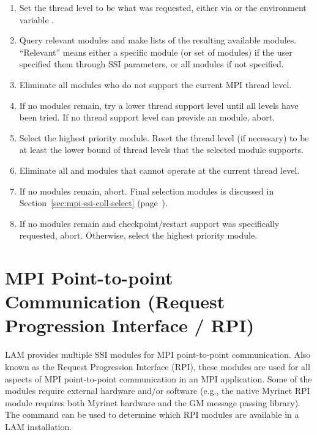 \begin{enumerate}
\item Set the thread level to be what was requested, either via
   or the environment variable
  .

\item Query relevant modules and make lists of the resulting available
  modules.  ``Relevant'' means either a specific module (or set of
  modules) if the user specified them through SSI parameters, or all
  modules if not specified.
  
\item Eliminate all modules who do not support the current MPI thread
  level.

\item If no  modules remain, try a lower thread support
  level until all levels have been tried.  If no thread support level
  can provide an  module, abort.
  
\item Select the highest priority  module.  Reset the thread
  level (if necessary) to be at least the lower bound of thread levels
  that the selected  module supports.
  
\item Eliminate all  and  modules that cannot
  operate at the current thread level.
  
\item If no  modules remain, abort.  Final selection
   modules is discussed in
  Section~\ref{sec:mpi-ssi-coll-select}
  (page~\pageref{sec:mpi-ssi-coll-select}).

\item If no  modules remain and checkpoint/restart support
  was specifically requested, abort.  Otherwise, select the highest
  priority  module.
\end{enumerate}


\section{MPI Point-to-point Communication (Request Progression
  Interface / RPI)}
\label{sec:mpi-ssi-rpi}

LAM provides multiple SSI modules for MPI point-to-point
communication.  Also known as the Request Progression Interface (RPI),
these modules are used for all aspects of MPI point-to-point
communication in an MPI application.  Some of the modules require
external hardware and/or software (e.g., the native Myrinet RPI module
requires both Myrinet hardware and the GM message passing library).
The  command can be used to determine which RPI modules
are available in a LAM installation.

